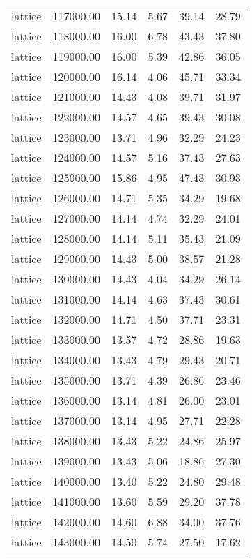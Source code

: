 \begin{table}[ht]
\begin{table}[ht]
\begin{tabular}{|cccccc}
  lattice & 117000.00 & 15.14 & 5.67 & 39.14 & 28.79 \\ 
  lattice & 118000.00 & 16.00 & 6.78 & 43.43 & 37.80 \\ 
  lattice & 119000.00 & 16.00 & 5.39 & 42.86 & 36.05 \\ 
  lattice & 120000.00 & 16.14 & 4.06 & 45.71 & 33.34 \\ 
  lattice & 121000.00 & 14.43 & 4.08 & 39.71 & 31.97 \\ 
  lattice & 122000.00 & 14.57 & 4.65 & 39.43 & 30.08 \\ 
  lattice & 123000.00 & 13.71 & 4.96 & 32.29 & 24.23 \\ 
  lattice & 124000.00 & 14.57 & 5.16 & 37.43 & 27.63 \\ 
  lattice & 125000.00 & 15.86 & 4.95 & 47.43 & 30.93 \\ 
  lattice & 126000.00 & 14.71 & 5.35 & 34.29 & 19.68 \\ 
  lattice & 127000.00 & 14.14 & 4.74 & 32.29 & 24.01 \\ 
  lattice & 128000.00 & 14.14 & 5.11 & 35.43 & 21.09 \\ 
  lattice & 129000.00 & 14.43 & 5.00 & 38.57 & 21.28 \\ 
  lattice & 130000.00 & 14.43 & 4.04 & 34.29 & 26.14 \\ 
  lattice & 131000.00 & 14.14 & 4.63 & 37.43 & 30.61 \\ 
  lattice & 132000.00 & 14.71 & 4.50 & 37.71 & 23.31 \\ 
  lattice & 133000.00 & 13.57 & 4.72 & 28.86 & 19.63 \\ 
  lattice & 134000.00 & 13.43 & 4.79 & 29.43 & 20.71 \\ 
  lattice & 135000.00 & 13.71 & 4.39 & 26.86 & 23.46 \\ 
  lattice & 136000.00 & 13.14 & 4.81 & 26.00 & 23.01 \\ 
  lattice & 137000.00 & 13.14 & 4.95 & 27.71 & 22.28 \\ 
  lattice & 138000.00 & 13.43 & 5.22 & 24.86 & 25.97 \\ 
  lattice & 139000.00 & 13.43 & 5.06 & 18.86 & 27.30 \\ 
  lattice & 140000.00 & 13.40 & 5.22 & 24.80 & 29.48 \\ 
  lattice & 141000.00 & 13.60 & 5.59 & 29.20 & 37.78 \\ 
  lattice & 142000.00 & 14.60 & 6.88 & 34.00 & 37.76 \\ 
  lattice & 143000.00 & 14.50 & 5.74 & 27.50 & 17.62 \\ 

\end{tabular}
\end{table}
\end{table}
